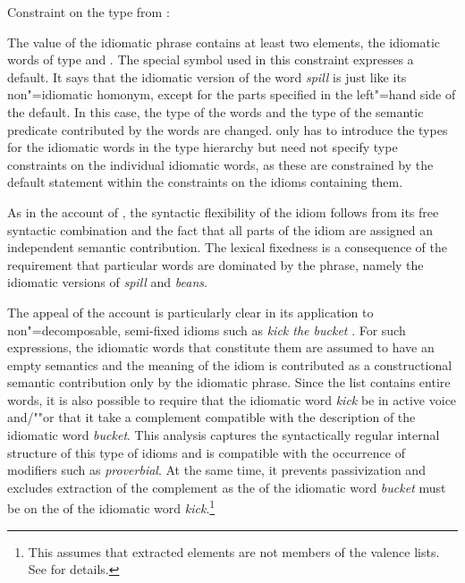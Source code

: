 \documentclass[output=paper
 	        ,biblatex
                ,babelshorthands
                ,newtxmath
                ,draftmode
                ,colorlinks, citecolor=brown
]{langscibook}
\begin{document}
\vbox{
\ea Constraint on the type  from \citet[185]{Riehemann2001a}:\label{sr-spillbeans}\\
\z 
}

\noindent
The  value of the idiomatic phrase contains at least two elements, the idiomatic words
of type  and .  The special symbol {\scriptsize \srdefault} used in
this constraint expresses a default. It says that the idiomatic version of the word
\emph{spill} is just like its non"=idiomatic homonym, except for the parts specified in the
left"=hand side of the default.  In this case, the type of the words and the type of the semantic
predicate contributed by the words are changed.  \citet{Riehemann2001a} only has to introduce the
types for the idiomatic words in the type hierarchy but need not specify type constraints on the
individual idiomatic words, as these are constrained by the default statement within the constraints
on the idioms containing them.


As in the account of \citet{KE94a}, the syntactic flexibility of the idiom follows from its free
syntactic combination and the fact that all parts of the idiom are assigned an independent semantic
contribution. The lexical fixedness is a consequence of the requirement that particular words are
dominated by the phrase, namely the idiomatic versions of \emph{spill} and \emph{beans}.

The appeal of the account is particularly clear in its application to non"=de\-com\-posable,
semi-fixed idioms such as \emph{kick the bucket} \citep[]{Riehemann2001a}.  For such
expressions, the idiomatic words that constitute them are assumed to have an empty semantics and the
meaning of the idiom is contributed as a constructional semantic contribution only by the idiomatic
phrase.  Since the  list contains entire words, it is also possible to require that the
idiomatic word \emph{kick} be in active voice and/""or that it take a complement compatible with the
description of the idiomatic word \emph{bucket}.  This analysis captures the syntactically regular
internal structure of this type of idioms and is compatible with the occurrence of modifiers such as
\emph{proverbial}. At the same time, it prevents passivization and excludes extraction of the
complement as the \synsemv of the idiomatic word \emph{bucket} must be on the \compsl of the
idiomatic word \emph{kick}.\footnote{%
This assumes that extracted elements are not members of the valence lists. See
\crossrefchapterw[\pageref{udc:ex-slashed-verb-traceless}]{udc} for details.
}
\end{document}
